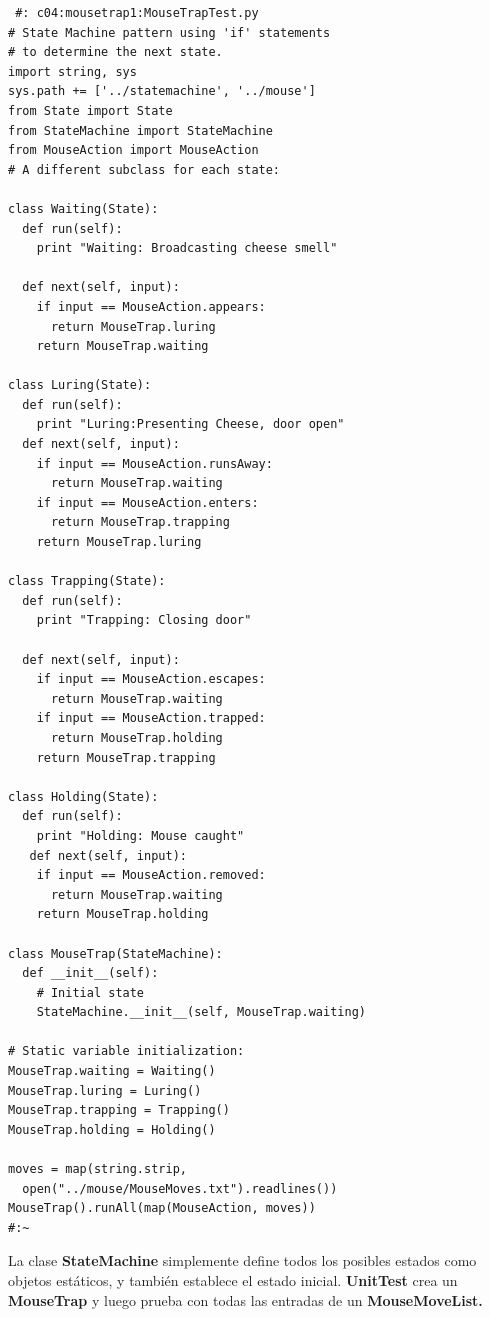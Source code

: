 \documentclass{article}
\begin{document}
\begin{lstlisting}  
 #: c04:mousetrap1:MouseTrapTest.py 
# State Machine pattern using 'if' statements 
# to determine the next state. 
import string, sys 
sys.path += ['../statemachine', '../mouse'] 
from State import State 
from StateMachine import StateMachine 
from MouseAction import MouseAction 
# A different subclass for each state:

class Waiting(State): 
  def run(self):  
    print "Waiting: Broadcasting cheese smell" 
    
  def next(self, input): 
    if input == MouseAction.appears: 
      return MouseTrap.luring 
    return MouseTrap.waiting 
    
class Luring(State): 
  def run(self): 
    print "Luring:Presenting Cheese, door open" 
  def next(self, input): 
    if input == MouseAction.runsAway: 
      return MouseTrap.waiting 
    if input == MouseAction.enters: 
      return MouseTrap.trapping 
    return MouseTrap.luring 
    
class Trapping(State): 
  def run(self): 
    print "Trapping: Closing door"
    
  def next(self, input): 
    if input == MouseAction.escapes: 
      return MouseTrap.waiting 
    if input == MouseAction.trapped: 
      return MouseTrap.holding 
    return MouseTrap.trapping 
    
class Holding(State): 
  def run(self): 
    print "Holding: Mouse caught" 
   def next(self, input): 
    if input == MouseAction.removed: 
      return MouseTrap.waiting 
    return MouseTrap.holding 
    
class MouseTrap(StateMachine): 
  def __init__(self):  
    # Initial state 
    StateMachine.__init__(self, MouseTrap.waiting) 
    
# Static variable initialization: 
MouseTrap.waiting = Waiting() 
MouseTrap.luring = Luring() 
MouseTrap.trapping = Trapping() 
MouseTrap.holding = Holding() 

moves = map(string.strip,  
  open("../mouse/MouseMoves.txt").readlines()) 
MouseTrap().runAll(map(MouseAction, moves)) 
#:~ 
  \end{lstlisting}
  
  La clase \textbf{StateMachine} simplemente define todos los posibles estados como objetos estáticos, y también establece el estado inicial. \textbf{UnitTest} crea un \textbf{MouseTrap} y luego prueba con todas las entradas de un \textbf{MouseMoveList.}    \newline
  
\end{document}
